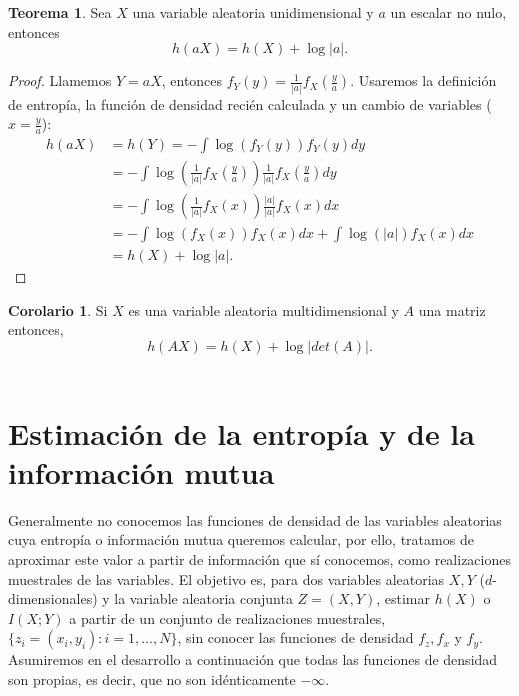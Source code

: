 \documentclass[12pt,a4paper]{report} %
\theoremstyle{definition}
\newtheorem{theorem}{Teorema}[section]
\newtheorem{corollary}{Corolario}[theorem]
\begin{document}
\begin{theorem}
  Sea $X$ una variable aleatoria unidimensional y $a$ un escalar no nulo, entonces\[
h(aX) = h(X) + \log |a|.
  \]
\end{theorem}

\begin{proof}
  Llamemos $Y = aX$, entonces $f_Y(y) = \frac{1}{|a|}f_X\left (\frac{y}{a} \right )$. Usaremos la definición de entropía, la función de densidad recién calculada y un cambio de variables ($x = \frac{y}{a}$):
  \begin{align*}
    h(aX) &= h(Y) = -\int \log \left(f_Y(y)\right) f_Y(y)dy\\[3pt]
    &=  -\int \log \left ( \frac{1}{|a|}f_X\left (\frac{y}{a} \right ) \right ) \frac{1}{|a|}f_X\left (\frac{y}{a} \right ) dy\\[3pt]
    &= -\int  \log \left ( \frac{1}{|a|}f_X\left (x \right ) \right )\frac{|a|}{|a|}f_X\left (x \right ) dx\\[3pt]
    &= -\int \log \left (f_X\left (x \right ) \right ) f_X\left (x \right ) dx + \int\log\left({|a|}\right) f_X(x)dx\\[3pt]
    &= h(X) + \log{|a|}.
  \end{align*}
\end{proof}

\begin{corollary}
  Si $X$ es una variable aleatoria multidimensional y $A$ una matriz entonces,\[
h(AX) = h(X) + \log|det(A)|.
  \]\\[-10pt]
\end{corollary}


\section{Estimación de la entropía y de la información mutua}

Generalmente no conocemos las funciones de densidad de las variables aleatorias cuya entropía o información mutua queremos calcular, por ello, tratamos de aproximar este valor a partir de información que sí conocemos, como realizaciones muestrales de las variables. El objetivo es, para dos variables aleatorias $X,Y$ ($d$-dimensionales) y la variable aleatoria conjunta $Z = (X,Y)$, estimar $h(X)$ o $I(X;Y)$ a partir de un conjunto de realizaciones muestrales, $\{z_i=(x_i,y_i) : i = 1,\dots, N\}$, sin conocer las funciones de densidad $f_z, f_x$ y $f_y$.  Asumiremos en el desarrollo a continuación que todas las funciones de densidad son propias, es decir, que no son idénticamente $-\infty$.\\
\end{document}
